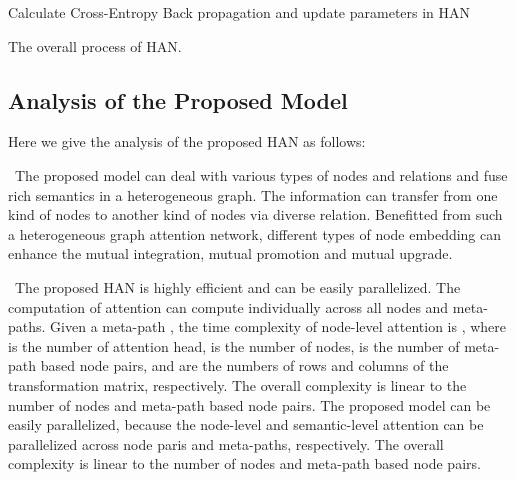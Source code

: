\begin{algorithm}[ht]

	\BlankLine
	Calculate Cross-Entropy  \;
	Back propagation and update parameters in HAN\;
	\caption{The overall process of HAN.}
	\label{alg:aggre}
\end{algorithm}


\subsection{Analysis of the Proposed Model}
Here we give the analysis of the proposed HAN as follows:

\textbullet\ The proposed model can deal with various types of nodes and relations and fuse rich semantics in a heterogeneous graph. The information can transfer from one kind of nodes to another kind of nodes via diverse relation.  Benefitted from such a heterogeneous graph attention network, different types of node embedding can enhance the mutual integration, mutual promotion and mutual upgrade. 


\textbullet\
	The proposed HAN is highly efficient and can be easily parallelized.
The computation of attention can compute individually across all nodes and meta-paths.
	Given a meta-path , the time complexity of 
	node-level attention is , 
where  is the number of attention head,
 is the number of nodes,  
	 is the number of meta-path based node pairs, 
	 and  are the numbers of rows and columns of the transformation matrix, respectively.
	The overall complexity is linear to the number of nodes and 
	meta-path based node pairs. The proposed model can be easily parallelized, because the node-level and semantic-level attention can be parallelized across node paris and meta-paths, respectively.
	The overall complexity is linear to the number of nodes and meta-path based node pairs.
	
